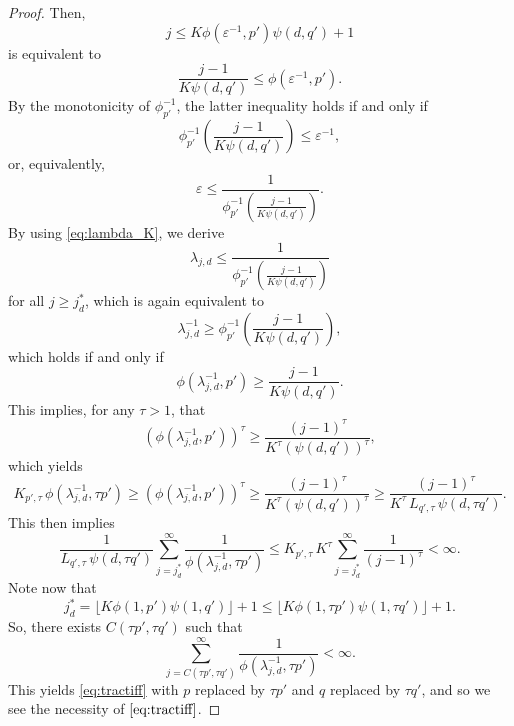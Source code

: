 \documentclass[11pt,a4paper]{article}
\begin{document}
\begin{proof}
Then, 
\[
j \le K \phi(\varepsilon^{-1},p')\psi(d,q') +1
\]
is equivalent to
\[
\frac{j-1}{K \psi(d,q')} \le \phi(\varepsilon^{-1},p').
\]
By the monotonicity of $\phi_{p'}^{-1}$, the latter inequality holds if and only if
\[
  \phi_{p'}^{-1} \left(\frac{j-1}{K \psi(d,q')} \right)
  \le \varepsilon^{-1},
\]
or, equivalently,
\[
 \varepsilon \le \frac{1}{\phi_{p'}^{-1} \left(\frac{j-1}{K \psi(d,q')} \right)}.
\]
By using \eqref{eq:lambda_K}, we derive
\[
 \lambda_{j,d}\le \frac{1}{\phi_{p'}^{-1} \left(\frac{j-1}{K \psi(d,q')} \right)}
\]
for all $j\ge j_d^*$, which is again equivalent to 
\[
\lambda_{j,d}^{-1}\ge \phi_{p'}^{-1} \left(\frac{j-1}{K \psi(d,q')} \right),
\]
which holds if and only if
\[ 
 \phi (\lambda_{j,d}^{-1}, p') \ge \frac{j-1}{K \psi(d,q')}.
\]
This implies, for any $\tau>1$, that 
\[ 
 (\phi (\lambda_{j,d}^{-1}, p'))^\tau \ge \frac{(j-1)^\tau}{K^\tau (\psi(d,q'))^\tau},
\]
which yields
\[ 
 K_{p',\tau}\, \phi (\lambda_{j,d}^{-1}, \tau p') \ge (\phi (\lambda_{j,d}^{-1}, p'))^\tau 
 \ge \frac{(j-1)^\tau}{K^\tau (\psi(d,q'))^\tau}\ge \frac{(j-1)^\tau}{K^\tau\, L_{q',\tau}\, \psi(d,\tau q')}.
\]
This then implies
\[
\frac{1}{L_{q',\tau}\, \psi(d,\tau q')} \sum_{j=j_d^*}^\infty \frac{1}{\phi (\lambda_{j,d}^{-1}, \tau p')} 
\le K_{p',\tau}\, K^\tau \sum_{j=j_d^*}^\infty \frac{1}{(j-1)^\tau}<\infty.
\]
Note now that
\[
 j_d^* = \lfloor K \phi(1,p')\psi (1,q')\rfloor +1 \le \lfloor K\phi(1,\tau p')\psi (1,\tau q')\rfloor +1.
\]
So, there exists $C(\tau p',\tau q')$ such that 
\[
 \sum_{j=C(\tau p',\tau q')}^\infty \frac{1}{\phi (\lambda_{j,d}^{-1}, \tau p')}<\infty.
\]
This yields \eqref{eq:tractiff} with $p$ replaced by $\tau p'$ and $q$ replaced by $\tau q'$, and so we see the necessity of $\eqref{eq:tractiff}$. 

\end{proof}
\newpage
\bigskip
\end{document}
